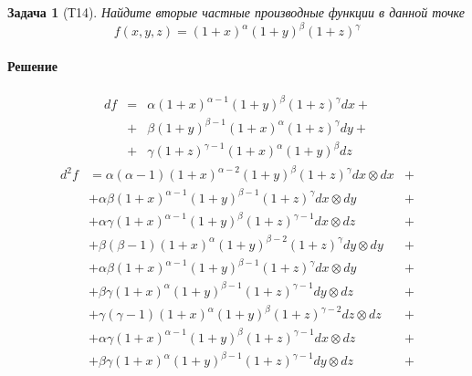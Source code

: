 \documentclass[a4paper,12pt]{report}
\newtheorem{problem}{Задача}[]
\newenvironment{sol}{\paragraph{Решение}}{}
\begin{document}
	
	\newpage
    
    \begin{problem}[Т14]
        Найдите вторые частные производные функции в данной точке
        \begin{equation*}
            f(x,y,z)=(1+x)^{\alpha}(1+y)^{\beta}(1+z)^{\gamma}
        \end{equation*}
    \end{problem}
    \begin{sol}
        \begin{eqnarray*}
            df&=&\alpha(1+x)^{\alpha-1}(1+y)^\beta (1+z)^\gamma dx+\\ 
            &+&\beta(1+y)^{\beta-1}(1+x)^\alpha(1+z)^\gamma dy+\\ 
            &+&\gamma(1+z)^{\gamma-1}(1+x)^\alpha(1+y)^\beta dz
        \end{eqnarray*}
        \begin{eqnarray*}
            d^2f&=\alpha(\alpha-1)(1+x)^{\alpha-2}(1+y)^\beta(1+z)^\gamma dx\otimes dx&+\\ 
            &+\alpha\beta(1+x)^{\alpha-1}(1+y)^{\beta-1}(1+z)^\gamma dx\otimes dy&+\\
            &+\alpha\gamma(1+x)^{\alpha-1}(1+y)^\beta(1+z)^{\gamma-1}dx\otimes dz&+\\ 
            &+\beta(\beta-1)(1+x)^\alpha(1+y)^{\beta-2}(1+z)^\gamma dy\otimes dy&+\\ 
            &+\alpha\beta(1+x)^{\alpha-1}(1+y)^{\beta-1}(1+z)^\gamma dx\otimes dy &+\\ 
            &+\beta\gamma(1+x)^\alpha (1+y)^{\beta-1}(1+z)^{\gamma-1}dy\otimes dz&+\\ 
            &+\gamma(\gamma-1)(1+x)^\alpha(1+y)^\beta(1+z)^{\gamma-2} dz\otimes dz&+\\ 
            &+\alpha\gamma(1+x)^{\alpha-1}(1+y)^\beta(1+z)^{\gamma-1}dx\otimes dz&+\\ 
            &+\beta\gamma(1+x)^\alpha(1+y)^{\beta-1}(1+z)^{\gamma-1}dy\otimes dz&+
        \end{eqnarray*}
    \end{sol}
	
\end{document}
